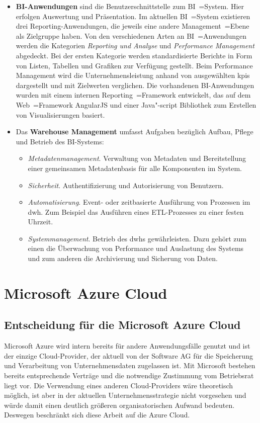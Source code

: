 \begin{itemize}
\item \textbf{BI-Anwendungen} sind die Benutzerschnittstelle zum BI~=System. Hier erfolgen Auswertung und Präsentation. Im aktuellen BI~=System existieren drei Reporting-Anwendungen, die jeweils eine andere Management~=Ebene als Zielgruppe haben. Von den verschiedenen Arten an BI~=Anwendungen werden die Kategorien \textit{Reporting und Analyse} und \textit{Performance Management} abgedeckt. Bei der ersten Kategorie werden standardisierte Berichte in Form von Listen, Tabellen und Grafiken zur Verfügung gestellt. Beim {Performance Management} wird die Unternehmensleistung anhand von ausgewählten \acp{kpi} dargestellt und mit Zielwerten verglichen. Die vorhandenen BI-Anwendungen wurden mit einem internen Reporting~=Framework entwickelt, das auf dem Web~=Framework AngularJS und einer Java"-script Bibliothek zum Erstellen von Visualisierungen basiert.
\item Das \textbf{Warehouse Management} umfasst Aufgaben bezüglich Aufbau, Pflege und Betrieb des BI-Systems:
\begin{itemize}
\item \textit{Metadatenmanagement}. Verwaltung von Metadaten und Bereitstellung einer gemeinsamen Metadatenbasis für alle Komponenten im System.
\item \textit{Sicherheit}. Authentifizierung und Autorisierung von Benutzern.
\item \textit{Automatisierung}. Event- oder zeitbasierte Ausführung von Prozessen im \ac{dwh}. Zum Beispiel das Ausführen eines ETL-Prozesses zu einer festen Uhrzeit.
\item \textit{Systemmanagement}. Betrieb des \ac{dwh}s gewährleisten. Dazu gehört zum einen die Überwachung von Performance und Auslastung des Systems und zum anderen die Archivierung und Sicherung von Daten.
\end{itemize}
\end{itemize}

\section{Microsoft Azure Cloud} \label{sec:grundlagen:bi_in_der_cloud_mit_azure}

\subsection{Entscheidung für die Microsoft Azure Cloud} \label{subsec:grundlagen:azure:entscheidungFürAzure}
Microsoft Azure wird intern bereits für andere Anwendungsfälle genutzt und ist der einzige Cloud-Provider, der aktuell von der Software AG für die Speicherung und Verarbeitung von Unternehmensdaten zugelassen ist. Mit Microsoft bestehen bereits entsprechende Verträge und die notwendige Zustimmung vom Betriebsrat liegt vor. Die Verwendung eines anderen Cloud-Providers wäre theoretisch möglich, ist aber in der aktuellen Unternehmensstrategie nicht vorgesehen und würde damit einen deutlich größeren organisatorischen Aufwand bedeuten. Deswegen beschränkt sich diese Arbeit auf die Azure Cloud.

